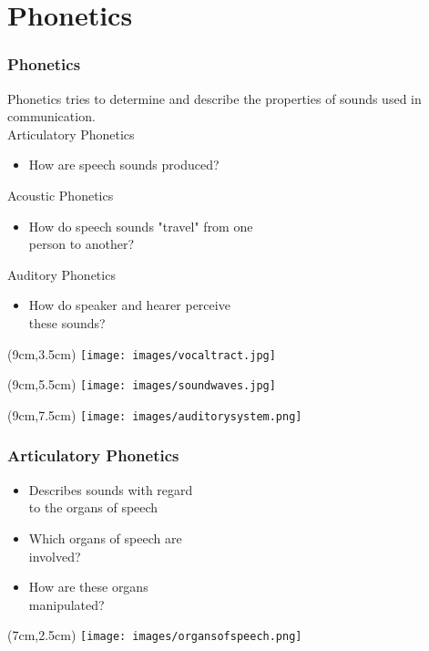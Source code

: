 \documentclass[12pt, table]{beamer}
\begin{document}
\section{Phonetics}
\begin{frame}
\frametitle{Phonetics}
Phonetics tries to determine and describe the properties of sounds used in communication.\\
Articulatory Phonetics
\begin{itemize}
\item How are speech sounds produced?
\end{itemize}
Acoustic Phonetics
\begin{itemize}
\item How do speech sounds "travel" from one \\
person to another?\\
\end{itemize}
Auditory Phonetics 
\begin{itemize}
\item How do speaker and hearer perceive\\
these sounds?
\end{itemize}
\begin{textblock*}{4cm}(9cm,3.5cm)
\texttt{[image: images/vocaltract.jpg]}
\end{textblock*}
\begin{textblock*}{6cm}(9cm,5.5cm)
\texttt{[image: images/soundwaves.jpg]}
\end{textblock*}
\begin{textblock*}{8cm}(9cm,7.5cm)
\texttt{[image: images/auditorysystem.png]}
\end{textblock*}
\end{frame}

\begin{frame}
\frametitle{Articulatory Phonetics}
\begin{itemize}
\item Describes sounds with regard\\
to the organs of speech
\item Which organs of speech are\\
involved?
\item How are these organs\\
manipulated?
\end{itemize}
\begin{textblock*}{8cm}(7cm,2.5cm)
\texttt{[image: images/organsofspeech.png]}
\end{textblock*}
\end{frame}
\end{document}
